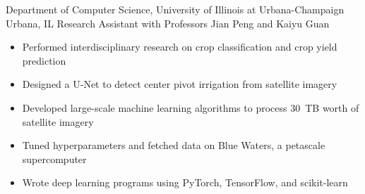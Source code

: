 
        {Department of Computer Science, University of Illinois at Urbana-Champaign}
        {Urbana, IL}
        {Research Assistant}
        {with Professors Jian Peng and Kaiyu Guan}{
    \begin{itemize}
        \item Performed interdisciplinary research on crop classification and crop yield prediction
        \item Designed a U-Net to detect center pivot irrigation from satellite imagery
        \item Developed large-scale machine learning algorithms to process 30~TB worth of satellite imagery
        \item Tuned hyperparameters and fetched data on Blue Waters, a petascale supercomputer
        \item Wrote deep learning programs using PyTorch, TensorFlow, and scikit-learn
    \end{itemize}
}
